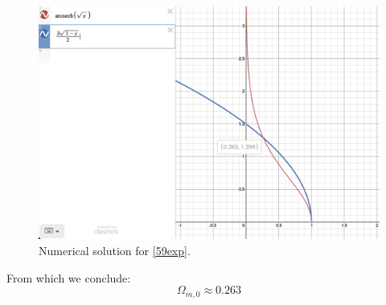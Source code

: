 \begin{figure}[htbp]
    \centering
    \includegraphics[scale=0.25]{Images/Q5-9.png}
    \caption{Numerical solution for \eqref{59exp}.}
    \label{plot59}
\end{figure}

From which we conclude:
\begin{equation}
    \boxed{\Omega_{m, 0} \approx 0.263}
\end{equation}

